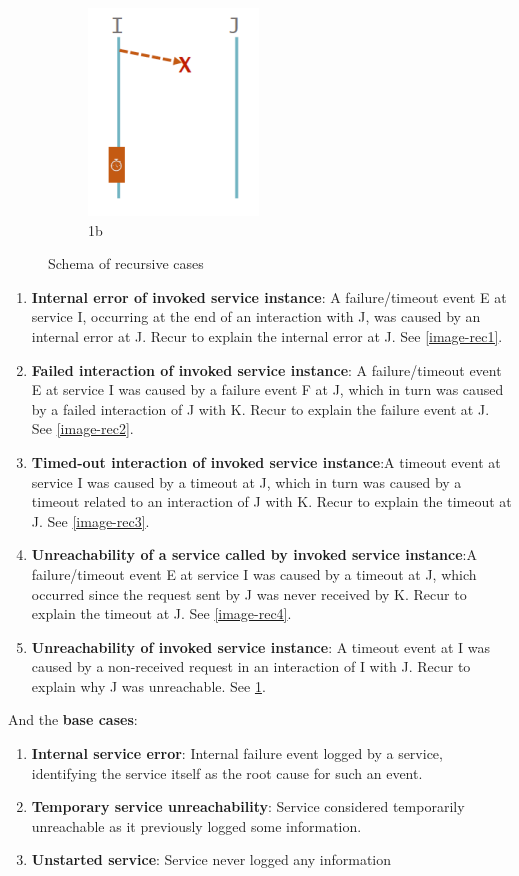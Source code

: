 \documentclass[10pt,a4paper]{report}
\begin{document}
\begin{figure}
\begin{subfigure}{.5\textwidth}
		\centering
		\includegraphics[width=.3\linewidth]{image-rec5}
		\caption{1b}
		\label{image-rec5}
	\end{subfigure}
	\caption{Schema of recursive cases}
	\label{fig:base-cases}
\end{figure}
\begin{enumerate}
	\item \textbf{Internal error of invoked service instance}: A failure/timeout event E at service I, occurring at the end of an interaction with J, was caused by an internal error at J. Recur to explain the internal error at J. See \ref{image-rec1}.
	
	\item \textbf{Failed interaction of invoked service instance}: A failure/timeout
	event E at service I was caused by a failure event F at J, which in turn
	was caused by a failed interaction of J with K. Recur to explain the failure
	event at J. See \ref{image-rec2}.
	
	\item \textbf{Timed-out interaction of invoked service instance}:A timeout event at
	service I was caused by a timeout at J, which in turn was caused by a timeout
	related to an interaction of J with K. Recur to explain the timeout at J. See \ref{image-rec3}.
	
	\item \textbf{Unreachability of a service called by invoked service instance}:A
	failure/timeout event E at service I was caused by a timeout at J, which
	occurred since the request sent by J was never received by K. Recur to
	explain the timeout at J. See \ref{image-rec4}.
	
	\item \textbf{Unreachability of invoked service instance}: A timeout event at I was
	caused by a non-received request in an interaction of I with J. Recur to explain why J was unreachable. See \ref{image-rec5}.
\end{enumerate}
And the \textbf{base cases}:
\begin{enumerate}
	\item \textbf{Internal service error}: Internal failure event logged by a service, identifying the service itself as the root cause for such an event.
	\item \textbf{Temporary service unreachability}: Service considered temporarily unreachable as it previously logged some information.
	\item \textbf{Unstarted service}: Service never logged any information
\end{enumerate}
\end{document}
